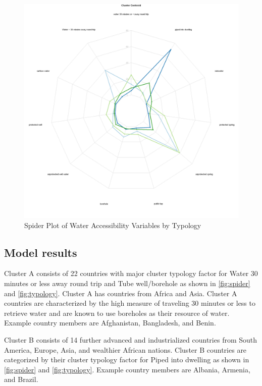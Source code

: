 \documentclass[10pt,twoside]{article}
\numberwithin{equation}{section}
\newcommand{\?}{\stackrel{?}{=}}
\begin{document}
\begin{figure}[h!]
  \centering
  \includegraphics[width= 1\textwidth]{spider-plot}
  \caption{Spider Plot of Water Accessibility Variables by Typology}
  \label{fig:spider}
\end{figure}

\subsection{Model results}
Cluster A consists of 22 countries with major cluster typology factor for Water 30 minutes or less away round trip and Tube well/borehole as shown in \autoref{fig:spider} and \autoref{fig:typology}. Cluster A has countries from Africa and Asia. Cluster A countries are characterized by the high measure of traveling 30 minutes or less to retrieve water and are known to use boreholes as their resource of water. Example country members are Afghanistan, Bangladesh, and Benin. 

Cluster B consists of 14 further advanced and industrialized countries from South America, Europe, Asia, and wealthier African nations. Cluster B countries are categorized by their cluster typology factor for Piped into dwelling as shown in \autoref{fig:spider} and \autoref{fig:typology}. Example country members are Albania, Armenia, and Brazil. 
\end{document}
